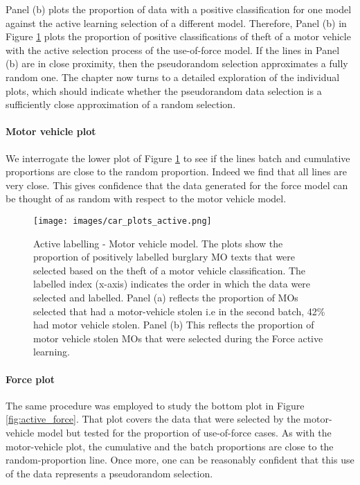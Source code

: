 Panel (b) plots the proportion of data with a positive classification for one model against the active learning selection of a different model. Therefore, Panel (b) in Figure \ref{fig:active_car}  plots the proportion of positive classifications of theft of a motor vehicle with the active selection process of the use-of-force model. If the lines in Panel (b) are in close proximity, then the pseudorandom selection approximates a fully random one. The chapter now turns to a detailed exploration of the individual plots, which should indicate whether the pseudorandom data selection is a sufficiently close approximation of a random selection. 


\paragraph{Motor vehicle plot}We interrogate the lower plot of Figure \ref{fig:active_car} to see if the lines batch and cumulative proportions are close to the random proportion. Indeed we find that all lines are very close. This gives confidence that the data generated for the force model can be thought of as random with respect to the motor vehicle model. 

\begin{figure}[!ht]
  \centering
    \texttt{[image: images/car\_plots\_active.png]}
    \caption[Active labelling - Motor vehicle model. ]{{Active labelling - Motor vehicle model.} The plots show the proportion of positively labelled burglary MO texts that were selected based on the theft of a motor vehicle classification. The labelled index (x-axis) indicates the order in which the data were selected and labelled. Panel (a) reflects the proportion of MOs selected that had a motor-vehicle stolen i.e in the second batch, 42\% had motor vehicle stolen. Panel (b) This reflects the proportion of motor vehicle stolen MOs that were selected during the Force active learning.}
    \label{fig:active_car}
\end{figure}


\paragraph{Force plot}  The same procedure was employed to study the bottom plot in Figure \ref{fig:active_force}. That plot covers the data that were selected by the motor-vehicle model but tested for the proportion of use-of-force cases. As with the motor-vehicle plot, the cumulative and the batch proportions are close to the random-proportion line. Once more, one can be reasonably confident that this use of the data represents a pseudorandom selection.

